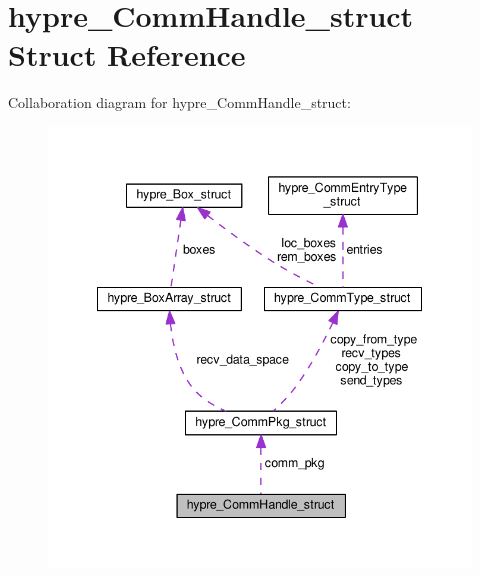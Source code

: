 \hypertarget{structhypre__CommHandle__struct}{}\section{hypre\+\_\+\+Comm\+Handle\+\_\+struct Struct Reference}
\label{structhypre__CommHandle__struct}


Collaboration diagram for hypre\+\_\+\+Comm\+Handle\+\_\+struct\+:
\nopagebreak
\begin{figure}[H]
\begin{center}
\leavevmode
\includegraphics[width=342pt]{structhypre__CommHandle__struct__coll__graph}
\end{center}
\end{figure}
